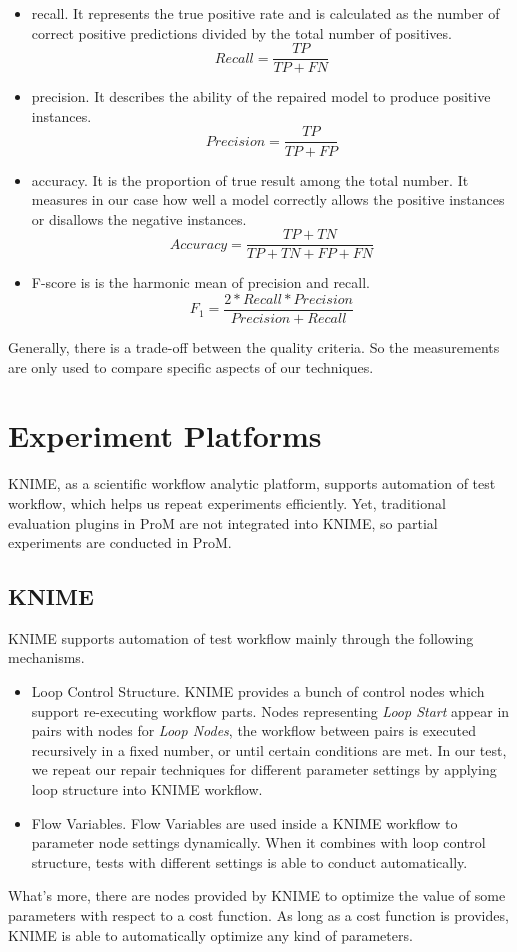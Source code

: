 \begin{itemize}
	\item recall. It represents the true positive rate and is calculated as the number of correct positive predictions divided by the total number of positives.
	\[Recall = \frac{TP}{TP + FN}\]
	\item precision. It describes the ability of the repaired model to produce positive instances.
	\[Precision = \frac{TP}{TP + FP }\]
	\item accuracy. It is the proportion of true result among the total number. It  measures in our case how well a model correctly allows the positive instances or disallows the negative instances.
	\[Accuracy = \frac{TP+TN}{TP+TN+FP+FN}\]
	\item F-score is is the harmonic mean of precision and recall.
	\[F_1 = \frac{2*Recall*Precision}{Precision + Recall}\]
\end{itemize}
Generally, there is a trade-off between the quality criteria. So the measurements are only used to compare specific aspects of our techniques.
\section{Experiment Platforms}
KNIME, as a scientific workflow analytic platform, supports automation of test workflow, which helps us repeat experiments efficiently. Yet, traditional evaluation plugins in ProM are not integrated into KNIME, so partial experiments are conducted in ProM.
\subsection{KNIME}
KNIME supports automation of test workflow mainly through the following mechanisms. 
\begin{itemize}
	\item Loop Control Structure. KNIME provides a bunch of control nodes which support re-executing workflow parts.  Nodes representing \emph{Loop Start} appear in pairs with nodes for \emph{Loop Nodes}, the workflow between pairs is executed recursively in a fixed number, or until certain conditions are met. In our test, we repeat our repair techniques for different parameter settings by applying loop structure into KNIME workflow.
	\item Flow Variables. Flow Variables are used inside a KNIME workflow to parameter node settings dynamically. When it combines with loop control structure, tests with different settings is able to conduct automatically.
\end{itemize}
What's more, there are nodes provided by KNIME to optimize the value of some parameters with respect to a cost function. As long as a cost function is provides, KNIME is able to automatically optimize any kind of parameters. 

